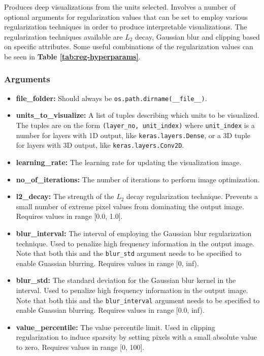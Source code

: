 \noindent Produces deep visualizations from the units selected. Involves a number of optional arguments for regularization values that can be set to employ various regularization techniques in order to produce interpretable visualizations. The regularization techniques available are $L_2$ decay, Gaussian blur and clipping based on specific attributes. Some useful combinations of the regularization values can be seen in \textbf{Table \ref{tab:reg-hyperparams}}.

\subsubsection*{Arguments}

\begin{itemize}
    \item \textbf{file\_folder:} Should always be \texttt{os.path.dirname(\_\_file\_\_)}.
    \item \textbf{units\_to\_visualize:} A list of tuples describing which units to be visualized. The tuples are on the form \texttt{(layer\_no, unit\_index)} where \texttt{unit\_index} is a number for layers with 1D output, like \texttt{keras.layers.Dense}, or a 3D tuple for layers with 3D output, like \texttt{keras.layers.Conv2D}.
    \item \textbf{learning\_rate:} The learning rate for updating the visualization image.
    \item \textbf{no\_of\_iterations:} The number of iterations to perform image optimization.
    \item \textbf{l2\_decay:} The strength of the $L_2$ decay regularization technique. Prevents a small number of extreme pixel values from dominating the output image. Requires values in range [0.0, 1.0].
    \item \textbf{blur\_interval:} The interval of employing the Gaussian blur regularization technique. Used to penalize high frequency information in the output image. Note that both this and the \texttt{blur\_std} argument needs to be specified to enable Guassian blurring. Requires values in range [0, inf).
    \item \textbf{blur\_std:} The standard deviation for the Gaussian blur kernel in the interval. Used to penalize high frequency information in the output image. Note that both this and the \texttt{blur\_interval} argument needs to be specified to enable Guassian blurring. Requires values in range [0.0, inf).
    \item \textbf{value\_percentile:} The value percentile limit. Used in clipping regularization to induce sparsity by setting pixels with a small absolute value to zero. Requires values in range [0, 100].

\end{itemize}
